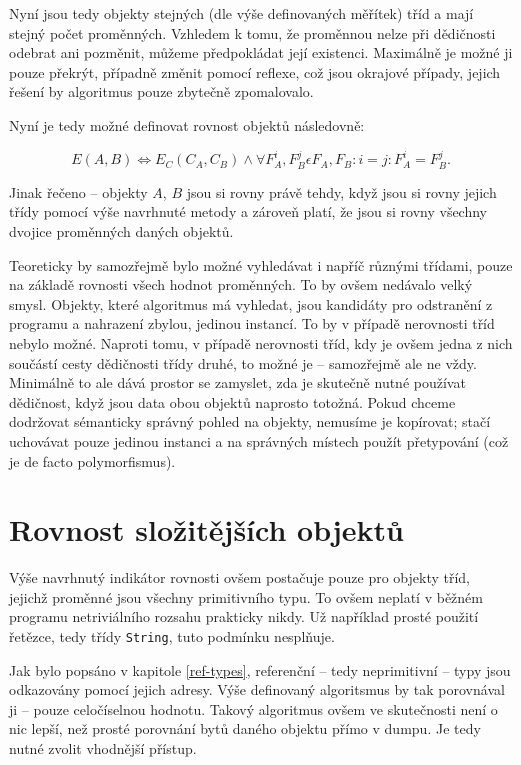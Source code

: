 Nyní jsou tedy objekty stejných (dle výše definovaných měřítek) tříd a mají stejný počet proměnných. Vzhledem k tomu, že proměnnou nelze při dědičnosti odebrat ani pozměnit, můžeme předpokládat její existenci. Maximálně je možné ji pouze překrýt, případně změnit pomocí reflexe, což jsou okrajové případy, jejich řešení by algoritmus pouze zbytečně zpomalovalo.

Nyní je tedy možné definovat rovnost objektů následovně:

\begin{equation}
E(A, B) \Leftrightarrow E_C(C_A, C_B) \wedge \forall F_A^i, F_B^j \epsilon F_A, F_B: i = j: F_A^i = F_B^j.
\end{equation}

Jinak řečeno -- objekty $A$, $B$ jsou si rovny právě tehdy, když jsou si rovny jejich třídy pomocí výše navrhnuté metody a zároveň platí, že jsou si rovny všechny dvojice proměnných daných objektů. 

Teoreticky by samozřejmě bylo možné vyhledávat i napříč různými třídami, pouze na základě rovnosti všech hodnot proměnných. To by ovšem nedávalo velký smysl. Objekty, které algoritmus má vyhledat, jsou kandidáty pro odstranění z programu a nahrazení zbylou, jedinou instancí. To by v případě nerovnosti tříd nebylo možné. Naproti tomu, v případě nerovnosti tříd, kdy je ovšem jedna z nich součástí cesty dědičnosti třídy druhé, to možné je -- samozřejmě ale ne vždy. Minimálně to ale dává prostor se zamyslet, zda je skutečně nutné používat dědičnost, když jsou data obou objektů naprosto totožná. Pokud chceme dodržovat sémanticky správný pohled na objekty, nemusíme je kopírovat; stačí uchovávat pouze jedinou instanci a na správných místech použít přetypování (což je de facto polymorfismus).

\section{Rovnost složitějších objektů}
Výše navrhnutý indikátor rovnosti ovšem postačuje pouze pro objekty tříd, jejichž proměnné jsou všechny primitivního typu. To ovšem neplatí v běžném programu netriviálního rozsahu prakticky nikdy. Už například prosté použití řetězce, tedy třídy \texttt{String}, tuto podmínku nesplňuje.

Jak bylo popsáno v kapitole \ref{ref-types}, referenční -- tedy neprimitivní -- typy jsou odkazovány pomocí jejich adresy. Výše definovaný algoritsmus by tak porovnával ji -- pouze celočíselnou hodnotu. Takový algoritmus ovšem ve skutečnosti není o nic lepší, než prosté porovnání bytů daného objektu přímo v dumpu. Je tedy nutné zvolit vhodnější přístup.

